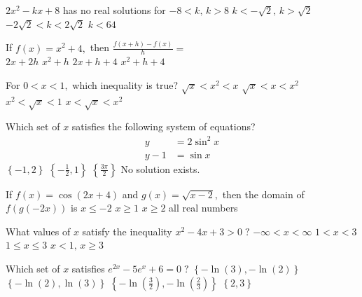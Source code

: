 \begin{question}
\(2x^2 - kx + 8\) has no real solutions for 
\choices
{\(-8 < k, \, k > 8\)}
{\(k < - \sqrt 2, \, k > \sqrt 2\)}
{}
{\(-2 \sqrt 2 < k < 2 \sqrt 2\)}
{\(k < 64\)}
\end{question}

\begin{question}
If \(f(x) = x^2 + 4,\) then 
\(\frac{f(x + h) - f(x)}{h} =\) \\
\choicesline
{}
{\(2x + 2h\)}
{\(x^2 + h\)}
{\(2x + h + 4\)}
{\(x^2 + h + 4\)}
\end{question}

\begin{question}
For \(0 < x < 1,\) which inequality is true?
\choices
{\(\sqrt x < x^2 < x\)}
{}
{\(\sqrt x < x < x^2\)}
{\(x^2 < \sqrt x < 1\)}
{\(x < \sqrt x < x^2\)}
\end{question}

\begin{question}
Which set of \(x\) satisfies the following system of equations?
\[
\begin{aligned}
    y &= 2 \sin^2 x \\
    y - 1 &= \sin x
\end{aligned}
\]
\choices
{\(\left\{-1, 2\right\}\)}
{\(\left\{-\frac{1}{2}, 1\right\}\)}
{\(\left\{\frac{3 \pi}{2}\right\}\)}
{}
{No solution exists.}
\end{question}

\begin{question}
If \(f(x) = \cos(2x + 4)\) and \(g(x) = \sqrt{x - 2},\) 
then the domain of \(f(g(-2x))\) is 
\choices
{\(x \leqslant -2\)}
{}
{\(x \geqslant 1\)}
{\(x \geqslant 2\)}
{all real numbers}
\end{question}

\begin{question}
What values of \(x\) satisfy the inequality \(x^2 - 4x + 3 > 0 \; ?\)
\choices
{\(-\infty < x < \infty\)}
{\(1 < x < 3\)}
{\(1 \leqslant x \leqslant 3\)}
{}
{\(x < 1, \, x \geqslant 3\)}
\end{question}

\begin{question}
Which set of \(x\) satisfies \(e^{2x} - 5e^x + 6 = 0 \; ?\)
\choices
{\(\left\{-\ln(3), -\ln(2)\right\}\)}
{\(\left\{ -\ln(2), \ln(3)\right\}\)}
{\(\left\{-\ln \left(\frac{3}{2}\right), -\ln \left(\frac{2}{3}\right)\right\}\)}
{}
{\(\left\{2, 3\right\}\)}
\end{question}

